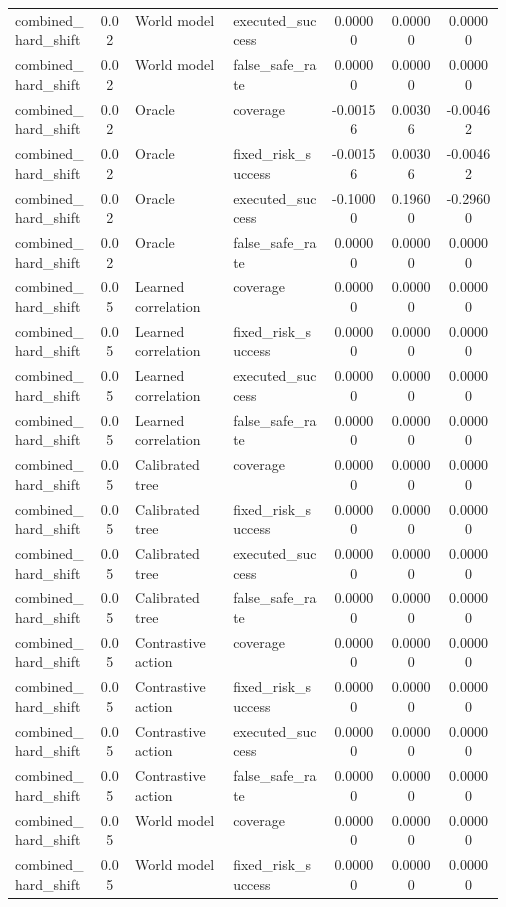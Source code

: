 \documentclass{article}
\begin{document}
\begin{center}
\begin{longtable}{p{0.17\linewidth}cp{0.20\linewidth}p{0.20\linewidth}ccc}
combined\_hard\_shift & 0.02 & World model & executed\_success & 0.00000 & 0.00000 & 0.00000\\
combined\_hard\_shift & 0.02 & World model & false\_safe\_rate & 0.00000 & 0.00000 & 0.00000\\
combined\_hard\_shift & 0.02 & Oracle & coverage & -0.00156 & 0.00306 & -0.00462\\
combined\_hard\_shift & 0.02 & Oracle & fixed\_risk\_success & -0.00156 & 0.00306 & -0.00462\\
combined\_hard\_shift & 0.02 & Oracle & executed\_success & -0.10000 & 0.19600 & -0.29600\\
combined\_hard\_shift & 0.02 & Oracle & false\_safe\_rate & 0.00000 & 0.00000 & 0.00000\\
combined\_hard\_shift & 0.05 & Learned correlation & coverage & 0.00000 & 0.00000 & 0.00000\\
combined\_hard\_shift & 0.05 & Learned correlation & fixed\_risk\_success & 0.00000 & 0.00000 & 0.00000\\
combined\_hard\_shift & 0.05 & Learned correlation & executed\_success & 0.00000 & 0.00000 & 0.00000\\
combined\_hard\_shift & 0.05 & Learned correlation & false\_safe\_rate & 0.00000 & 0.00000 & 0.00000\\
combined\_hard\_shift & 0.05 & Calibrated tree & coverage & 0.00000 & 0.00000 & 0.00000\\
combined\_hard\_shift & 0.05 & Calibrated tree & fixed\_risk\_success & 0.00000 & 0.00000 & 0.00000\\
combined\_hard\_shift & 0.05 & Calibrated tree & executed\_success & 0.00000 & 0.00000 & 0.00000\\
combined\_hard\_shift & 0.05 & Calibrated tree & false\_safe\_rate & 0.00000 & 0.00000 & 0.00000\\
combined\_hard\_shift & 0.05 & Contrastive action & coverage & 0.00000 & 0.00000 & 0.00000\\
combined\_hard\_shift & 0.05 & Contrastive action & fixed\_risk\_success & 0.00000 & 0.00000 & 0.00000\\
combined\_hard\_shift & 0.05 & Contrastive action & executed\_success & 0.00000 & 0.00000 & 0.00000\\
combined\_hard\_shift & 0.05 & Contrastive action & false\_safe\_rate & 0.00000 & 0.00000 & 0.00000\\
combined\_hard\_shift & 0.05 & World model & coverage & 0.00000 & 0.00000 & 0.00000\\
combined\_hard\_shift & 0.05 & World model & fixed\_risk\_success & 0.00000 & 0.00000 & 0.00000\\

\end{longtable}
\end{center}
\end{document}

